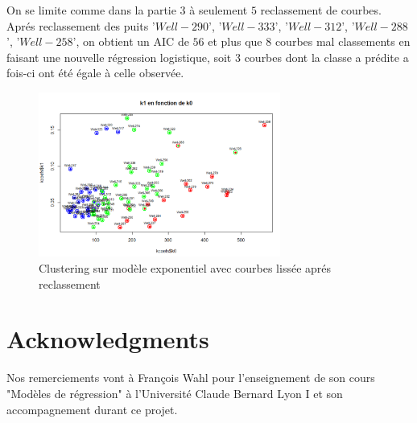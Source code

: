 \documentclass[12pt]{article}
\begin{document}
On se limite comme dans la partie $3$ à seulement $5$ reclassement de courbes.
Apr\'es reclassement des puits  '$Well-290$', '$Well-333$', '$Well-312$', '$Well-288$', '$Well-258$', on obtient un AIC de $56$ et plus que $8$ courbes mal classements en faisant une nouvelle r\'egression logistique, soit $3$ courbes dont la classe a  pr\'edite a fois-ci ont \'et\'e \'egale à celle observ\'ee.

\begin{figure}[H]
 \centering %
	\includegraphics[width=300px]{smooth_clustering_exp_2}
  \caption{\label{fig:reg_exp_clust_2} Clustering sur mod\`ele exponentiel avec courbes liss\'ee apr\'es reclassement}
\end{figure}



\section*{Acknowledgments}
Nos remerciements vont à Fran\c cois Wahl pour l'enseignement de son cours "Mod\`eles de r\'egression" à l'Universit\'e Claude Bernard Lyon I et son accompagnement durant ce projet.
\end{document}
